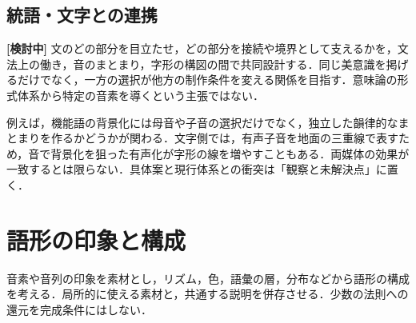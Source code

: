 \documentclass[../../main-detail.tex]{subfiles}
\begin{document}
\subsection{統語・文字との連携}
\textbf{[検討中]} 文のどの部分を目立たせ，どの部分を接続や境界として支えるかを，文法上の働き，音のまとまり，字形の構図の間で共同設計する．同じ美意識を掲げるだけでなく，一方の選択が他方の制作条件を変える関係を目指す．意味論の形式体系から特定の音素を導くという主張ではない．

例えば，機能語の背景化には母音や子音の選択だけでなく，独立した韻律的なまとまりを作るかどうかが関わる．文字側では，有声子音を地面の三重線で表すため，音で背景化を狙った有声化が字形の線を増やすこともある．両媒体の効果が一致するとは限らない．具体案と現行体系との衝突は「観察と未解決点」に置く．

\section{語形の印象と構成}\label{sec:zouko-material}
音素や音列の印象を素材とし，リズム，色，語彙の層，分布などから語形の構成を考える．局所的に使える素材と，共通する説明を併存させる．少数の法則への還元を完成条件にはしない．

\end{document}
